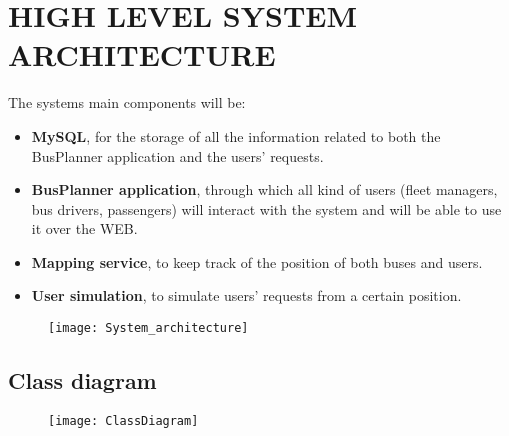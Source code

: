 \section{HIGH LEVEL SYSTEM ARCHITECTURE}
The system\textquotesingle s main components will be:
\begin{itemize}
	\item \textbf{MySQL}, for the storage of all the information related to both the BusPlanner application and the users' requests.
	\item \textbf{BusPlanner application}, through which all kind of users (fleet managers, bus drivers, passengers) will interact with the system and will be able to use it over the WEB.
	\item \textbf{Mapping service}, to keep track of the position of both buses and users.  
	\item \textbf{User simulation}, to simulate users' requests from a certain position.
\end{itemize}
\begin{figure}[H]
	\centering
	\texttt{[image: System\_architecture]}
\end{figure}
\subsection{Class diagram}
\begin{figure}[H]
	\centering
	\texttt{[image: ClassDiagram]}
\end{figure}